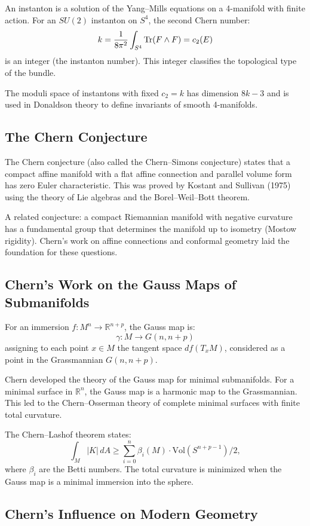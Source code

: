 An instanton is a solution of the Yang--Mills equations on a 4-manifold with finite action. For an $SU(2)$ instanton on $S^4$, the second Chern number:
\[
k = \frac{1}{8\pi^2} \int_{S^4} \Tr(F \wedge F) = c_2(E)
\]
is an integer (the instanton number). This integer classifies the topological type of the bundle.

The moduli space of instantons with fixed $c_2 = k$ has dimension $8k - 3$ and is used in Donaldson theory to define invariants of smooth 4-manifolds.

\subsection{The Chern Conjecture}

The Chern conjecture (also called the Chern--Simons conjecture) states that a compact affine manifold with a flat affine connection and parallel volume form has zero Euler characteristic. This was proved by Kostant and Sullivan (1975) using the theory of Lie algebras and the Borel--Weil--Bott theorem.

A related conjecture: a compact Riemannian manifold with negative curvature has a fundamental group that determines the manifold up to isometry (Mostow rigidity). Chern's work on affine connections and conformal geometry laid the foundation for these questions.

\subsection{Chern's Work on the Gauss Maps of Submanifolds}

For an immersion $f: M^n \to \mathbb{R}^{n+p}$, the Gauss map is:
\[
\gamma: M \to G(n, n+p)
\]
assigning to each point $x \in M$ the tangent space $df(T_xM)$, considered as a point in the Grassmannian $G(n, n+p)$.

Chern developed the theory of the Gauss map for minimal submanifolds. For a minimal surface in $\mathbb{R}^n$, the Gauss map is a harmonic map to the Grassmannian. This led to the Chern--Osserman theory of complete minimal surfaces with finite total curvature.

The Chern--Lashof theorem states:
\[
\int_M |K| \, dA \geq \sum_{i=0}^n \beta_i(M) \cdot \text{Vol}(S^{n+p-1})/2,
\]
where $\beta_i$ are the Betti numbers. The total curvature is minimized when the Gauss map is a minimal immersion into the sphere.

\subsection{Chern's Influence on Modern Geometry}

